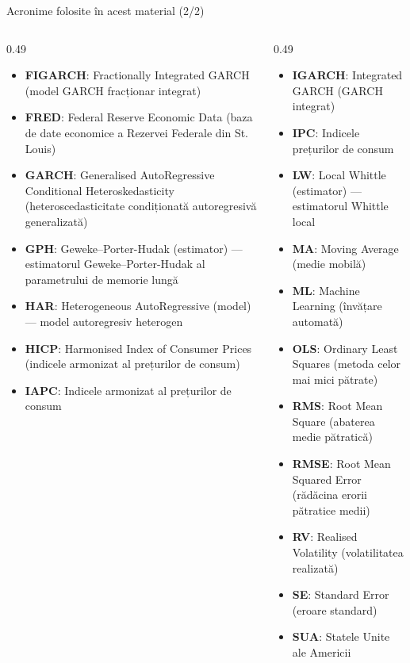 \begin{frame}{Acronime folosite în acest material (2/2)}
\begin{columns}[T]
\begin{column}{0.49\textwidth}
\begin{itemize}\setlength{\itemsep}{0pt}
    \item \textbf{FIGARCH}: Fractionally Integrated GARCH (model GARCH fracționar integrat)
    \item \textbf{FRED}: Federal Reserve Economic Data (baza de date economice a Rezervei Federale din St. Louis)
    \item \textbf{GARCH}: Generalised AutoRegressive Conditional Heteroskedasticity (heteroscedasticitate condiționată autoregresivă generalizată)
    \item \textbf{GPH}: Geweke–Porter-Hudak (estimator) — estimatorul Geweke–Porter-Hudak al parametrului de memorie lungă
    \item \textbf{HAR}: Heterogeneous AutoRegressive (model) — model autoregresiv heterogen
    \item \textbf{HICP}: Harmonised Index of Consumer Prices (indicele armonizat al prețurilor de consum)
    \item \textbf{IAPC}: Indicele armonizat al prețurilor de consum
\end{itemize}
\end{column}
\begin{column}{0.49\textwidth}
\begin{itemize}\setlength{\itemsep}{0pt}
    \item \textbf{IGARCH}: Integrated GARCH (GARCH integrat)
    \item \textbf{IPC}: Indicele prețurilor de consum
    \item \textbf{LW}: Local Whittle (estimator) — estimatorul Whittle local
    \item \textbf{MA}: Moving Average (medie mobilă)
    \item \textbf{ML}: Machine Learning (învățare automată)
    \item \textbf{OLS}: Ordinary Least Squares (metoda celor mai mici pătrate)
    \item \textbf{RMS}: Root Mean Square (abaterea medie pătratică)
    \item \textbf{RMSE}: Root Mean Squared Error (rădăcina erorii pătratice medii)
    \item \textbf{RV}: Realised Volatility (volatilitatea realizată)
    \item \textbf{SE}: Standard Error (eroare standard)
    \item \textbf{SUA}: Statele Unite ale Americii
\end{itemize}
\end{column}
\end{columns}
\end{frame}

